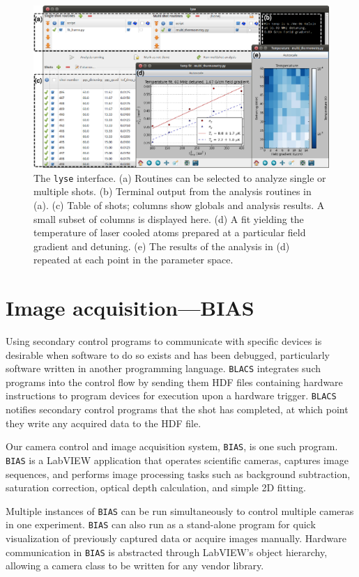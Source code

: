 \begin{figure}%
\includegraphics{figures/software/lyse.eps}%
\caption{
The \texttt{lyse} interface.
(a) Routines can be selected to analyze single or multiple shots.
(b) Terminal output from the analysis routines in (a).
(c) Table of shots; columns show globals and analysis results.
A small subset of columns is displayed here.
(d) A fit yielding the temperature of laser cooled atoms prepared at a particular field gradient and detuning.
(e) The results of the analysis in (d) repeated at each point in the parameter space.
 }%
\label{fig:lyse}%
\end{figure}

\section{Image acquisition---BIAS}\label{BIAS}
Using secondary control programs to communicate with specific devices is desirable when software to do so exists and has been debugged, particularly software written in another programming language.
\texttt{BLACS} integrates such programs into the control flow by sending them HDF files containing hardware instructions to program devices for execution upon a hardware trigger.
\texttt{BLACS} notifies secondary control programs that the shot has completed, at which point they write any acquired data to the HDF file.

Our camera control and image acquisition system, \texttt{BIAS}, is one such program.
\texttt{BIAS} is a LabVIEW application that operates scientific cameras, captures image sequences, and performs image processing tasks such as background subtraction, saturation correction, optical depth calculation, and simple 2D fitting.

Multiple instances of \texttt{BIAS} can be run simultaneously to control multiple cameras in one experiment.
\texttt{BIAS} can also run as a stand-alone program for quick visualization of previously captured data or acquire images manually.
Hardware communication in \texttt{BIAS} is abstracted through LabVIEW's object hierarchy, allowing a camera class to be written for any vendor library.

